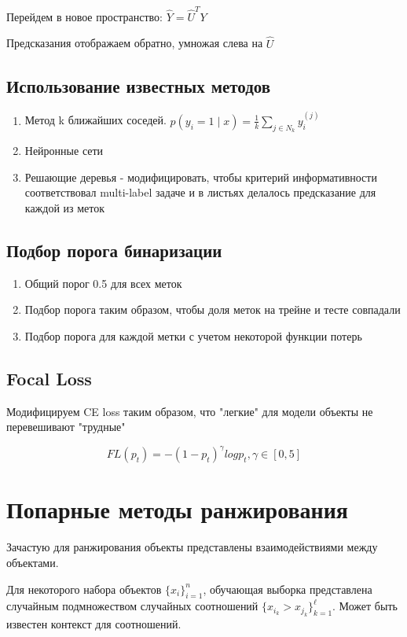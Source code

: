 \documentclass[a4paper, 12pt]{article}
\begin{document}
Перейдем в новое пространство: $\hat{Y} = \hat{U}^TY$

Предсказания отображаем обратно, умножая слева на $\hat{U}$

\subsection{Использование известных методов}

\begin{enumerate}
    \item Метод k ближайших соседей. 
    $p(y_i = 1 \mid x) = \frac{1}{k}\sum_{j \in N_k}y_i^(j)$
    \item Нейронные сети
    \item Решающие деревья - модифицировать, чтобы критерий информативности
    соответствовал multi-label задаче и в листьях делалось предсказание для
    каждой из меток
\end{enumerate}

\subsection{Подбор порога бинаризации}

\begin{enumerate}
    \item Общий порог 0.5 для всех меток
    \item Подбор порога таким образом, чтобы доля меток на трейне и тесте совпадали
    \item Подбор порога для каждой метки с учетом некоторой функции потерь
\end{enumerate}

\subsection{Focal Loss}

Модифицируем CE loss таким образом, что "легкие" для модели объекты 
не перевешивают "трудные"

\[FL(p_t) = -(1 - p_t)^{\gamma} log p_t, \gamma \in [0, 5]\]

\section{Попарные методы ранжирования}

Зачастую для ранжирования объекты представлены 
взаимодействиями между объектами.

Для некоторого набора объектов $\{x_i\}_{i = 1}^n$,
обучающая выборка представлена случайным подмножеством
случайных соотношений $\{x_{i_k} > x_{j_k}\}_{k = 1}^{\ell}$.
Может быть известен контекст для соотношений.
\end{document}
